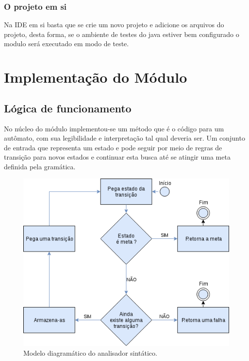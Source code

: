 \documentclass[12pt,a4paper,oneside,english,brazilian,brazil]{abntex2}
\begin{document}
\subsection{O projeto em si}
	\par Na IDE em si basta que se crie um novo projeto e adicione os arquivos do projeto, desta forma, se o ambiente de testes do java estiver bem configurado o modulo será executado em modo de teste. \
	
\chapter{Implementação do Módulo}

\section{Lógica de funcionamento}

\par No núcleo do módulo implementou-se um método que é o código para um autômato, com sua legibilidade e interpretação tal qual deveria ser. Um conjunto de entrada que representa um estado e pode seguir por meio de regras de transição para novos estados e continuar esta busca até se atingir uma meta definida pela gramática. \

\vspace{1cm}
\begin{figure}[H]
\centering
\includegraphics[scale=0.9]{Imagens/diagrama_analisador.png}
\caption{Modelo diagramático do analisador sintático.}
\end{figure}
\end{document}

